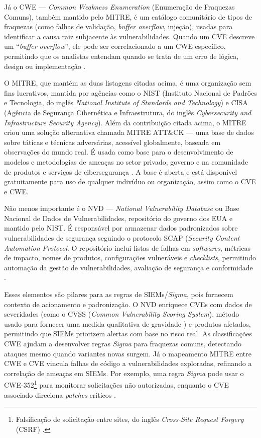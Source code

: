 Já o CWE --- \textit{Common Weakness Enumeration} (Enumeração de Fraquezas Comuns), também mantido pelo MITRE, é um catálogo comunitário de tipos de fraquezas (como falhas de validação, \textit{buffer overflow}, injeção), usadas para identificar a causa raiz subjacente às vulnerabilidades. 
Quando um CVE descreve um ``\textit{buffer overflow}'', ele pode ser correlacionado a um CWE específico, permitindo que os analistas entendam quando se trata de um erro de lógica, design ou implementação \cite{CWE_About, CWE_Usage_Guidance}.

O MITRE, que mantém as duas listagens citadas acima, é uma organização sem fins lucrativos, mantida por agências como o NIST (Instituto Nacional de Padrões e Tecnologia, do inglês \textit{National Institute of Standards and Technology}) 
e CISA (Agência de Segurança Cibernética e Infraestrutura, do inglês \textit{Cybersecurity and Infrastructure Security Agency}). 
Além da contribuição citada acima, o MITRE criou uma solução alternativa chamada MITRE ATT\&CK --- 
uma base de dados sobre táticas e técnicas adversárias, acessível globalmente, baseada em observações do mundo real. 
É usada como base para o desenvolvimento de modelos e metodologias de ameaças no setor privado, governo e na comunidade de produtos e serviços de cibersegurança \cite{MITRE_ATTACK}.
A base é aberta e está disponível gratuitamente para uso de qualquer indivíduo ou organização, assim como o CVE e CWE. 

Não menos importante é o NVD --- \textit{National Vulnerability Database} ou Base Nacional de Dados de Vulnerabilidades, repositório do governo dos EUA e mantido pelo NIST.
É responsável por armazenar dados padronizados sobre vulnerabilidades de segurança seguindo o protocolo SCAP (\textit{Security Content Automation Protocol}. 
O repositório inclui listas de falhas em \textit{softwares}, métricas de impacto, nomes de produtos, configurações vulneráveis e \textit{checklists}, permitindo automação da gestão de vulnerabilidades, avaliação de segurança e conformidade \cite{NIST_NVD_General}. 

Esses elementos são pilares para as regras de SIEMs/\textit{Sigma}, pois fornecem contexto de acionamento e padronização. 
O NVD enriquece CVEs com dados de severidades (como o CVSS (\textit{Common Vulnerability Scoring System}), método usado para fornecer uma medida qualitativa de gravidade \cite{NIST_NVD_Metrics})
e produtos afetados, permitindo que SIEMs priorizem alertas com base no risco real. 
As classificações CWE ajudam a desenvolver regras \textit{Sigma} para fraquezas comuns, detectando ataques mesmo quando variantes novas surgem.
Já o mapeamento MITRE entre CWE e CVE vincula falhas de código a vulnerabilidades exploradas, refinando a correlação de ameaças em SIEMs. 
Por exemplo, uma regra \textit{Sigma} pode usar o CWE-352\footnote{Falsificação de solicitação entre sites, do inglês \textit{Cross-Site Request Forgery} (CSRF) \cite{CWE_352}.} 
para monitorar solicitações não autorizadas, enquanto o CVE associado direciona \textit{patches} críticos \cite{nist_cwe_slice}.


